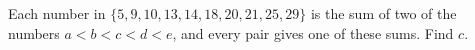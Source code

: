 Each number in $\{5,9,10,13,14,18,20,21,25,29\}$ is the sum of two of the numbers $a<b<c<d<e$, and every pair gives one of these sums. Find $c$.
